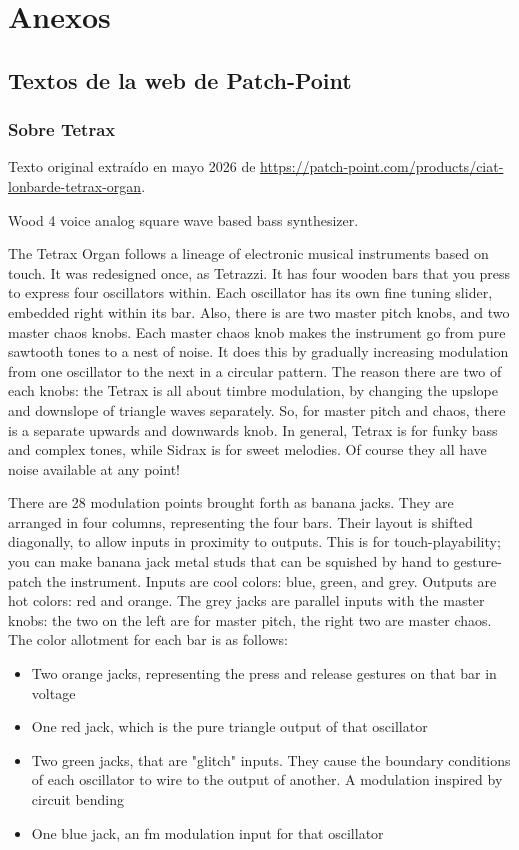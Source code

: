 \chapter{Anexos}

\section{Textos de la web de Patch-Point}

\subsection{Sobre Tetrax}

Texto original extraído en mayo 2026 de \url{https://patch-point.com/products/ciat-lonbarde-tetrax-organ}.

Wood 4 voice analog square wave based bass synthesizer.

The Tetrax Organ follows a lineage of electronic musical instruments based on touch. It was redesigned once, as Tetrazzi. It has four wooden bars that you press to express four oscillators within. Each oscillator has its own fine tuning slider, embedded right within its bar. Also, there is are two master pitch knobs, and two master chaos knobs. Each master chaos knob makes the instrument go from pure sawtooth tones to a nest of noise. It does this by gradually increasing modulation from one oscillator to the next in a circular pattern. The reason there are two of each knobs: the Tetrax is all about timbre modulation, by changing the upslope and downslope of triangle waves separately. So, for master pitch and chaos, there is a separate upwards and downwards knob. In general, Tetrax is for funky bass and complex tones, while Sidrax is for sweet melodies. Of course they all have noise available at any point!

There are 28 modulation points brought forth as banana jacks. They are arranged in four columns, representing the four bars. Their layout is shifted diagonally, to allow inputs in proximity to outputs. This is for touch-playability; you can make banana jack metal studs that can be squished by hand to gesture-patch the instrument. Inputs are cool colors: blue, green, and grey. Outputs are hot colors: red and orange. The grey jacks are parallel inputs with the master knobs: the two on the left are for master pitch, the right two are master chaos. The color allotment for each bar is as follows:

\begin{itemize}
	\item Two orange jacks, representing the press and release gestures on that bar in voltage
	\item One red jack, which is the pure triangle output of that oscillator
	\item Two green jacks, that are "glitch" inputs. They cause the boundary conditions of each oscillator to wire to the output of another. A modulation inspired by circuit bending
	\item One blue jack, an fm modulation input for that oscillator
\end{itemize}

